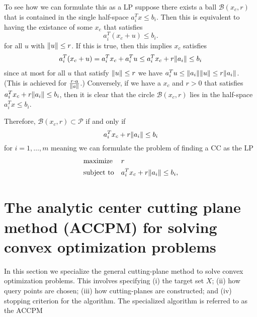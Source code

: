 \documentclass[11pt]{amsart}
\theoremstyle{definition}
\theoremstyle{remark}
\newcommand{\transpose}{T}
\begin{document}
        To see how we can formulate this as a LP suppose there exists a ball $\mathcal{B}(x_c, r)$  that is contained in the single half-space $a_i^\transpose x \leq b_i$. Then this is equivalent to having the existance of some $x_c$ that satisfies
        \begin{equation*}
            a_i^\transpose (x_c + u) \leq b_i. 
        \end{equation*}
        for all $u$ with $\norm{u} \leq r$. If this is true, then this implies $x_c$ satisfies 
        \begin{align*}
            a_i^\transpose (x_c + u) = a_i^\transpose x_c + a_i^\transpose u \leq a_i^\transpose x_c + r\norm{a_i} \leq b_i 
        \end{align*}
        since at most for all $u$ that satisfy $\norm{u} \leq r$ we have $a_i^\transpose u \leq \norm{a_i}\norm{u} \leq r \norm{a_i}$. (This is achieved for $\frac{r\cdot a}{\norm{a}}$.) Conversely, if we have a $x_c$ and $r > 0$ that satisfies $a_i^\transpose x_c + r\norm{a_i} \leq b_i$, then it is clear that the circle $\mathcal{B}(x_c, r)$ lies in the half-space $a_i^\transpose x \leq b_i$. 

        Therefore, $\mathcal{B}(x_c, r) \subset \mathcal{P}$ if and only if 
        \begin{equation*}
            a_i^\transpose x_c + r\norm{a_i} \leq b_i
        \end{equation*}
        for $i = 1, \dots, m$ meaning we can formulate the problem of finding a CC as the LP
        \begin{equation}\label{e:cc}
            \begin{aligned}
            & \text{maximize} && r  \\
            & \text{subject to} && a_i^\transpose x_c + r\norm{a_i} \leq b_i, 
            \end{aligned}
        \end{equation}


\section{The analytic center cutting plane method (ACCPM) for solving convex optimization problems}\label{s:accpm}
    In this section we specialize the general cutting-plane method to solve convex optimization problems. This involves specifying (i) the target set $X$; (ii) how query points are chosen; (iii) how cutting-planes are constructed; and (iv) stopping criterion for the algorithm. The specialized algorithm is referred to as the ACCPM
\end{document}
